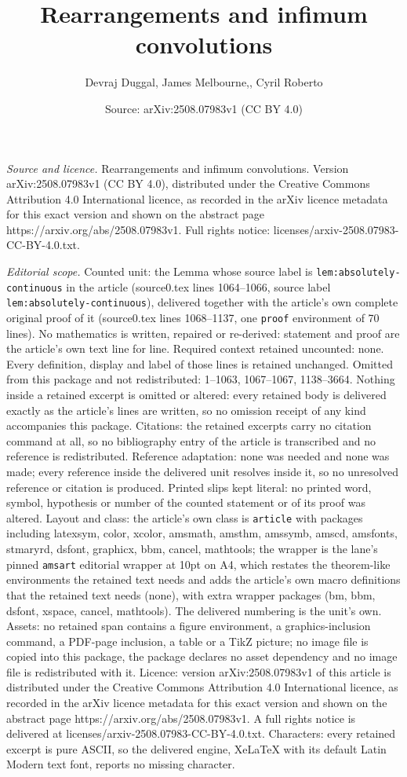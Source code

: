 \documentclass[10pt,a4paper]{amsart}
\title[Rearrangements and infimum convolutions]{Rearrangements and infimum convolutions}
\author{Devraj Duggal, James Melbourne,, Cyril Roberto}
\date{Source: arXiv:2508.07983v1 (CC BY 4.0)}
\begin{document}
\maketitle

\noindent\emph{Source and licence.} Rearrangements and infimum convolutions. Version arXiv:2508.07983v1 (CC BY 4.0), distributed under the Creative Commons Attribution 4.0 International licence, as recorded in the arXiv licence metadata for this exact version and shown on the abstract page https://arxiv.org/abs/2508.07983v1. Full rights notice: licenses/arxiv-2508.07983-CC-BY-4.0.txt.\par\smallskip

\noindent\textit{Editorial scope.} Counted unit: the Lemma whose source label is \texttt{lem:absolutely-continuous} in the article (source0.tex lines 1064--1066, source label \texttt{lem:absolutely-continuous}), delivered together with the article's own complete original proof of it (source0.tex lines 1068--1137, one \texttt{proof} environment of 70 lines). No mathematics is written, repaired or re-derived: statement and proof are the article's own text line for line. Required context retained uncounted: none. Every definition, display and label of those lines is retained unchanged. Omitted from this package and not redistributed: 1--1063, 1067--1067, 1138--3664. Nothing inside a retained excerpt is omitted or altered: every retained body is delivered exactly as the article's lines are written, so no omission receipt of any kind accompanies this package. Citations: the retained excerpts carry no citation command at all, so no bibliography entry of the article is transcribed and no reference is redistributed. Reference adaptation: none was needed and none was made; every reference inside the delivered unit resolves inside it, so no unresolved reference or citation is produced. Printed slips kept literal: no printed word, symbol, hypothesis or number of the counted statement or of its proof was altered. Layout and class: the article's own class is \texttt{article} with packages including latexsym, color, xcolor, amsmath, amsthm, amssymb, amscd, amsfonts, stmaryrd, dsfont, graphicx, bbm, cancel, mathtools; the wrapper is the lane's pinned \texttt{amsart} editorial wrapper at 10pt on A4, which restates the theorem-like environments the retained text needs and adds the article's own macro definitions that the retained text needs (none), with extra wrapper packages (bm, bbm, dsfont, xspace, cancel, mathtools). The delivered numbering is the unit's own. Assets: no retained span contains a figure environment, a graphics-inclusion command, a PDF-page inclusion, a table or a TikZ picture; no image file is copied into this package, the package declares no asset dependency and no image file is redistributed with it. Licence: version arXiv:2508.07983v1 of this article is distributed under the Creative Commons Attribution 4.0 International licence, as recorded in the arXiv licence metadata for this exact version and shown on the abstract page https://arxiv.org/abs/2508.07983v1. A full rights notice is delivered at licenses/arxiv-2508.07983-CC-BY-4.0.txt. Characters: every retained excerpt is pure ASCII, so the delivered engine, XeLaTeX with its default Latin Modern text font, reports no missing character.
\end{document}
